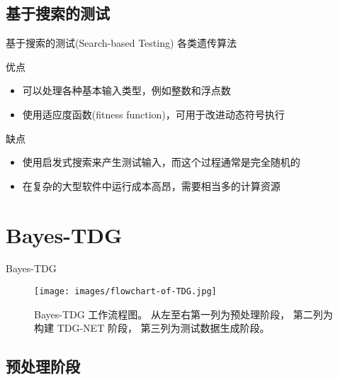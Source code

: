 \documentclass{beamer}
\begin{document}
    \subsection{基于搜索的测试}
    \begin{frame}{基于搜索的测试(Search-based Testing)}
        各类遗传算法
        \begin{block}{优点}
            \begin{itemize}
                \item 可以处理各种基本输入类型，例如整数和浮点数
                \item 使用适应度函数(fitness function)，可用于改进动态符号执行
            \end{itemize}
        \end{block}
        \begin{alertblock}{缺点}
            \begin{itemize}
                \item 使用启发式搜索来产生测试输入，而这个过程通常是完全随机的
                \item 在复杂的大型软件中运行成本高昂，需要相当多的计算资源
            \end{itemize}
        \end{alertblock}
    \end{frame}

    \section{Bayes-TDG}

    \begin{frame}{Bayes-TDG}
        \begin{figure}
            \centering
            \texttt{[image: images/flowchart-of-TDG.jpg]}
            \caption{Bayes-TDG 工作流程图。
                     从左至右第一列为预处理阶段，
                     第二列为构建 TDG-NET 阶段，
                     第三列为测试数据生成阶段。}
            \label{fig:bayes-TDG-flowchart}
        \end{figure}
    \end{frame}

    \subsection{预处理阶段}
\end{document}
